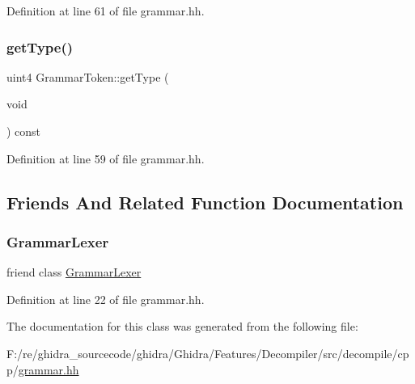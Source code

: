 Definition at line 61 of file grammar.\+hh.

\mbox{\label{class_grammar_token_a79430edcb770d6cfe7e5b5b879e34feb}} 
\subsubsection{\texorpdfstring{getType()}{getType()}}
{\footnotesize\ttfamily uint4 Grammar\+Token\+::get\+Type (\begin{DoxyParamCaption}\item[{void}]{ }\end{DoxyParamCaption}) const\hspace{0.3cm}{\ttfamily [inline]}}



Definition at line 59 of file grammar.\+hh.



\subsection{Friends And Related Function Documentation}
\mbox{\label{class_grammar_token_a3c6f83bd2b0fb98fea9b533d020c0af4}} 
\subsubsection{\texorpdfstring{GrammarLexer}{GrammarLexer}}
{\footnotesize\ttfamily friend class \mbox{\hyperlink{class_grammar_lexer}{Grammar\+Lexer}}\hspace{0.3cm}{\ttfamily [friend]}}



Definition at line 22 of file grammar.\+hh.



The documentation for this class was generated from the following file\+:\begin{DoxyCompactItemize}
\item 
F\+:/re/ghidra\+\_\+sourcecode/ghidra/\+Ghidra/\+Features/\+Decompiler/src/decompile/cpp/\mbox{\hyperlink{grammar_8hh}{grammar.\+hh}}\end{DoxyCompactItemize}

